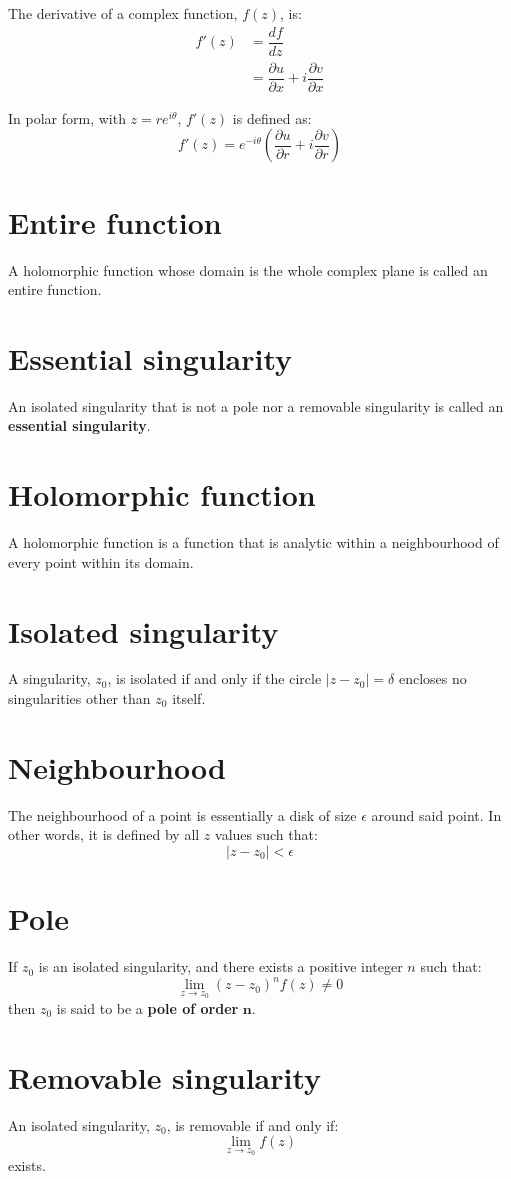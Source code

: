 \documentclass[12pt,a4paper]{article}
\newcommand{\labsec}[1]{\section{#1}
	\label{sec:#1}}
\begin{document}
	The derivative of a complex function, $f(z)$, is:
	\begin{align*}
		f'(z) &= \dfrac{df}{dz} \\
		&= \dfrac{\partial u}{\partial x} + i \dfrac{\partial v}{\partial x}
	\end{align*}

	In polar form, with $z = re^{i\theta}$, $f'(z)$ is defined as:
	\[
	f'(z) = e^{-i\theta} \left(\dfrac{\partial u}{\partial r}+i \dfrac{\partial v}{\partial r}\right)
	\]
	
	\labsec{Entire function}
	
	A holomorphic function whose domain is the whole complex plane is called an entire function.
	
	\labsec{Essential singularity}
	
	An isolated singularity that is not a pole nor a removable singularity is called an \textbf{essential singularity}.
	
	\labsec{Holomorphic function}
	
	A holomorphic function is a function that is analytic within a neighbourhood of every point within its domain.
	
	\labsec{Isolated singularity}
	
	A singularity, $z_0$, is isolated if and only if the circle $|z-z_0|=\delta$ encloses no singularities other than $z_0$ itself. 

	\labsec{Neighbourhood}
	
	The neighbourhood of a point is essentially a disk of size $\epsilon$ around said point. In other words, it is defined by all $z$ values such that:
	\[
	|z-z_0| < \epsilon
	\] 
	
	\labsec{Pole}
	
	If $z_0$ is an isolated singularity, and there exists a positive integer $n$ such that:
	\[
	\lim_{z\rightarrow z_0} (z-z_0)^n f(z) \neq 0
	\]
	then $z_0$ is said to be a \textbf{pole of order} $\mathbf{n}$. 
	
	\labsec{Removable singularity}
	
	An isolated singularity, $z_0$, is removable if and only if:
	\[
	\lim_{z \rightarrow z_0} f(z)
	\]
	exists. 
\end{document}
